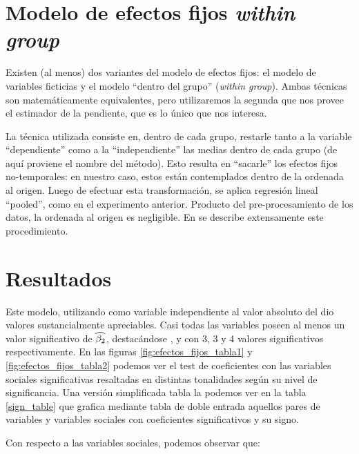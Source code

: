 \section{Modelo de efectos fijos \emph{within group}}

Existen (al menos) dos variantes del modelo de efectos fijos: el modelo de variables ficticias y el modelo ``dentro del grupo'' (\emph{within group}). Ambas técnicas son matemáticamente equivalentes, pero utilizaremos la segunda que nos provee el estimador de la pendiente, que es lo único que nos interesa.

La técnica utilizada consiste en, dentro de cada grupo, restarle tanto a la variable ``dependiente'' como a la ``independiente'' las medias dentro de cada grupo (de aquí proviene el nombre del método). Esto resulta en ``sacarle'' los efectos fijos no-temporales: en nuestro caso, estos están contemplados dentro de la ordenada al origen. Luego de efectuar esta transformación, se aplica regresión lineal ``pooled'', como en el experimento anterior. Producto del pre-procesamiento de los datos, la ordenada al origen es negligible. En \cite[chap 16]{gujarati1999} se describe extensamente este procedimiento.


\section{Resultados}

Este modelo, utilizando como variable independiente al valor absoluto del \entrainment dio valores sustancialmente apreciables. Casi todas las variables \ap poseen al menos un valor significativo de $\widehat{\beta_2}$, destacándose \ENGMEAN, \NOISETOHARMONICS y \FOMEAN  con 3, 3 y 4 valores significativos respectivamente. En las figuras \ref{fig:efectos_fijos_tabla1} y \ref{fig:efectos_fijos_tabla2} podemos ver el test de coeficientes con las variables sociales significativas resaltadas en distintas tonalidades según su nivel de significancia. Una versión simplificada tabla la podemos ver en la tabla \ref{sign_table} que grafica mediante tabla de doble entrada aquellos pares de variables \ap y variables sociales con coeficientes significativos y su signo.

Con respecto a las variables sociales, podemos observar que:

